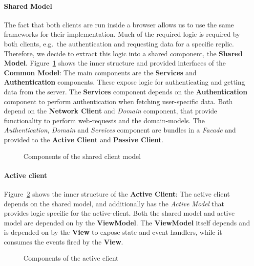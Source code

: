 \paragraph{Shared Model}
The fact that both clients are run inside a browser allows us to use the same frameworks for their implementation.
Much of the required logic is required by both clients, e.g.\ the authentication and requesting data for a specific replic.
Therefore, we decide to extract this logic into a shared component, the \textbf{Shared Model}. \newline
Figure~\ref{fig:component-clients-shared} shows the inner structure and provided interfaces of the \textbf{Common Model}:
The main components are the \textbf{Services} and \textbf{Authentication} components.
These expose logic for authenticating and getting data from the server.
The \textbf{Services} component depends on the \textbf{Authentication} component to perform authentication when fetching user-specific data.
Both depend on the \textbf{Network Client} and \textit{Domain} component, that provide functionality to perform web-requests and the domain-models.
The \textit{Authentication}, \textit{Domain} and \textit{Services} component are bundles in a \textit{Facade} and provided to the \textbf{Active Client} and \textbf{Passive Client}.

\begin{figure}
    \centering
    \caption{Components of the shared client model}
    \label{fig:component-clients-shared}
\end{figure}

\paragraph{Active client}
Figure~\ref{fig:component-clients-active} shows the inner structure of the \textbf{Active Client}: The active client depends on the shared model, and additionally has the \textit{Active Model} that provides logic specific for the active-client.
Both the shared model and active model are depended on by the \textbf{ViewModel}.
The \textbf{ViewModel} itself depends and is depended on by the \textbf{View} to expose state and event handlers, while it consumes the events fired by the \textbf{View}.

\begin{figure}
    \centering
    \caption{Components of the active client}
    \label{fig:component-clients-active}
\end{figure}

